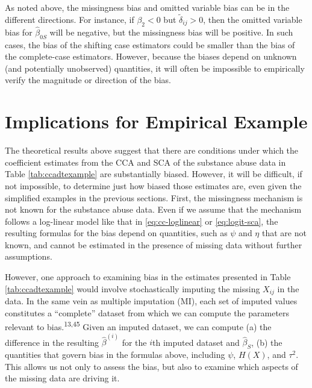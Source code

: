 \documentclass[
]{article}
\begin{document}
As noted above, the missingness bias and omitted variable bias can be in the different directions.
For instance, if \(\beta_2 < 0\) but \(\tilde{\delta}_{ij} > 0\), then the omitted variable bias for \(\hat{\beta}_{0S}\) will be negative, but the missingness bias will be positive.
In such cases, the bias of the shifting case estimators could be smaller than the bias of the complete-case estimators.
However, because the biases depend on unknown (and potentially unobserved) quantities, it will often be impossible to empirically verify the magnitude or direction of the bias.

\hypertarget{implications-for-empirical-example}{%
\section{Implications for Empirical Example}\label{implications-for-empirical-example}}

The theoretical results above suggest that there are conditions under which the coefficient estimates from the CCA and SCA of the substance abuse data in Table \ref{tab:ccadtexample} are substantially biased.
However, it will be difficult, if not impossible, to determine just how biased those estimates are, even given the simplified examples in the previous sections.
First, the missingness mechanism is not known for the substance abuse data.
Even if we assume that the mechanism follows a log-linear model like that in \eqref{eq:cc-loglinear} or \eqref{eq:logit-sca}, the resulting formulas for the bias depend on quantities, such as \(\psi\) and \(\eta\) that are not known, and cannot be estimated in the presence of missing data without further assumptions.

However, one approach to examining bias in the estimates presented in Table \ref{tab:ccadtexample} would involve stochastically imputing the missing \(X_{ij}\) in the data.
In the same vein as multiple imputation (MI), each set of imputed values constitutes a ``complete'' dataset from which we can compute the parameters relevant to bias.\textsuperscript{13,45}
Given an imputed dataset, we can compute (a) the difference in the resulting \(\hat{\beta}^{(i)}\) for the \(i\)th imputed dataset and \(\hat{\beta}_S\), (b) the quantities that govern bias in the formulas above, including \(\psi\), \(H(X)\), and \(\tau^2\).
This allows us not only to assess the bias, but also to examine which aspects of the missing data are driving it.
\end{document}
